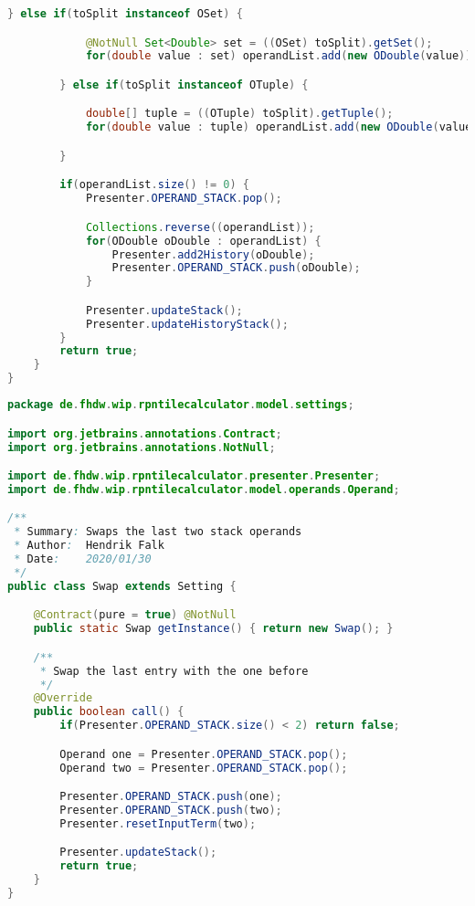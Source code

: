\begin{lstlisting}[caption=Split (Falk),label=list:Split,language=Java]
        } else if(toSplit instanceof OSet) {

            @NotNull Set<Double> set = ((OSet) toSplit).getSet();
            for(double value : set) operandList.add(new ODouble(value));

        } else if(toSplit instanceof OTuple) {

            double[] tuple = ((OTuple) toSplit).getTuple();
            for(double value : tuple) operandList.add(new ODouble(value));

        }

        if(operandList.size() != 0) {
            Presenter.OPERAND_STACK.pop();

            Collections.reverse((operandList));
            for(ODouble oDouble : operandList) {
                Presenter.add2History(oDouble);
                Presenter.OPERAND_STACK.push(oDouble);
            }

            Presenter.updateStack();
            Presenter.updateHistoryStack();
        }
        return true;
    }
}
\end{lstlisting}    

\begin{lstlisting}[caption=Swap (Falk),label=list:Swap,language=Java]
package de.fhdw.wip.rpntilecalculator.model.settings;

import org.jetbrains.annotations.Contract;
import org.jetbrains.annotations.NotNull;

import de.fhdw.wip.rpntilecalculator.presenter.Presenter;
import de.fhdw.wip.rpntilecalculator.model.operands.Operand;

/**
 * Summary: Swaps the last two stack operands
 * Author:  Hendrik Falk
 * Date:    2020/01/30
 */
public class Swap extends Setting {

    @Contract(pure = true) @NotNull
    public static Swap getInstance() { return new Swap(); }

    /**
     * Swap the last entry with the one before
     */
    @Override
    public boolean call() {
        if(Presenter.OPERAND_STACK.size() < 2) return false;

        Operand one = Presenter.OPERAND_STACK.pop();
        Operand two = Presenter.OPERAND_STACK.pop();

        Presenter.OPERAND_STACK.push(one);
        Presenter.OPERAND_STACK.push(two);
        Presenter.resetInputTerm(two);

        Presenter.updateStack();
        return true;
    }
}

\end{lstlisting}    

